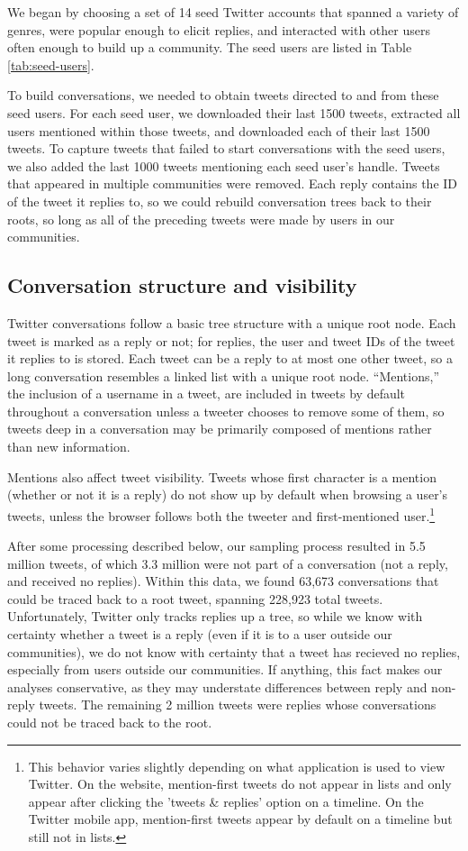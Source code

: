 \documentclass[11pt,letterpaper]{article}
\begin{document}
We began by choosing a set of 14 seed Twitter accounts that spanned a variety of genres, were popular enough to elicit replies, and interacted with other users often enough to build up a community.  The seed users are listed in Table \ref{tab:seed-users}.  

To build conversations, we needed to obtain tweets directed to and from these seed users. For each seed user, we downloaded their last 1500 tweets, extracted all users mentioned within those tweets, and downloaded each of their last 1500 tweets.  To capture tweets that failed to start conversations with the seed users, we also added the last 1000 tweets mentioning each seed user's handle.  Tweets that appeared in multiple communities were removed.  Each reply contains the ID of the tweet it replies to, so we could rebuild conversation trees back to their roots, so long as all of the preceding tweets were made by users in our communities.

\subsection{Conversation structure and visibility}\label{sect:conversation}

Twitter conversations follow a basic tree structure with a unique root node. Each tweet is marked as a reply or not; for replies, the user and tweet IDs of the tweet it replies to is stored. Each tweet can be a reply to at most one other tweet, so a long conversation resembles a linked list with a unique root node. ``Mentions,'' the inclusion of a username in a tweet, are included in tweets by default throughout a conversation unless a tweeter chooses to remove some of them, so tweets deep in a conversation may be primarily composed of mentions rather than new information.

Mentions also affect tweet visibility.  Tweets whose first character is a mention (whether or not it is a reply) do not show up by default when browsing a user's tweets, unless the browser follows both the tweeter and first-mentioned user.\footnote{This behavior varies slightly depending on what application is used to view Twitter.  On the website, mention-first tweets do not appear in lists and only appear after clicking the 'tweets \& replies' option on a timeline. On the Twitter mobile app, mention-first tweets appear by default on a timeline but still not in lists.}

After some processing described below, our sampling process resulted in 5.5 million tweets, of which 3.3 million were not part of a conversation (not a reply, and received no replies).  Within this data, we found 63,673 conversations that could be traced back to a root tweet, spanning 228,923 total tweets. Unfortunately, Twitter only tracks replies up a tree, so while we know with certainty whether a tweet is a reply (even if it is to a user outside our communities), we do not know with certainty that a tweet has recieved no replies, especially from users outside our communities. If anything, this fact makes our analyses conservative, as they may understate differences between reply and non-reply tweets. The remaining 2 million tweets were replies whose conversations could not be traced back to the root.
\end{document}
